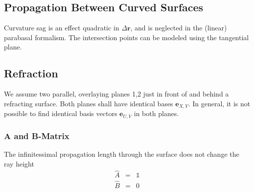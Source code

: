 \documentclass[12pt,a4paper,twoside,openright,BCOR10mm,headsepline,titlepage,abstracton,chapterprefix,final]{scrreprt}
\newcommand\Vector[1]{{\mathbf{#1}}}
\newcommand\unitmatrix{\mathds{1}}
\begin{document}
\subsection{Propagation Between Curved Surfaces}
Curvature sag is an effect quadratic in $\Delta \Vector{r}$, 
and is neglected in the (linear) parabasal formalism.
The intersection points can be modeled using the tangential plane.

\subsection{Refraction}
We assume two parallel, overlaying planes 1,2 just in front of and behind a refracting surface.
Both planes shall have identical bases $\Vector{e}_{X,Y}$.
In general, it is not possible to find identical basis vectors $\Vector{e}_{U,V}$ in both planes.

\subsubsection{A and B-Matrix}
The infinitessimal propagation length through the surface does not change the ray height
\begin{eqnarray}
 \hat{A} &=& \unitmatrix \\
 \hat{B} &=& 0
\end{eqnarray}
\end{document}
